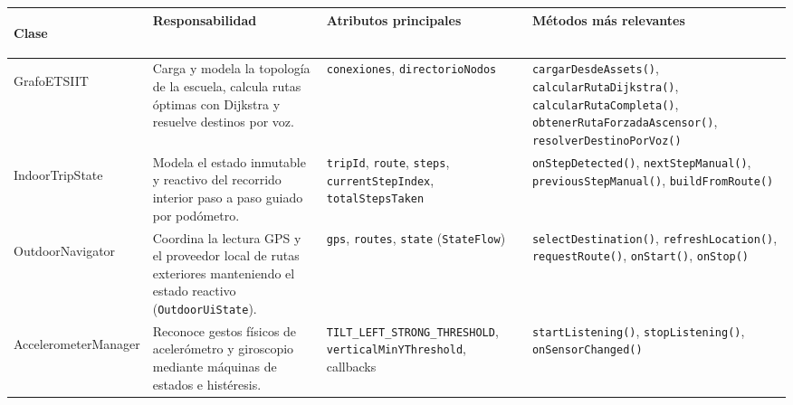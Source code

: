 \documentclass[11pt,a4paper]{article}
\begin{document}
\vspace{0.4cm}

\begin{table}[H]
\centering
\footnotesize
\setlength{\tabcolsep}{4.5pt}
\renewcommand{\arraystretch}{1.28}
\begin{tabularx}{\textwidth}{>{\bfseries\raggedright\arraybackslash}p{3.4cm} >{\raggedright\arraybackslash}p{4.1cm} >{\raggedright\arraybackslash}p{3.4cm} >{\raggedright\arraybackslash}X}
\toprule
\textbf{Clase} & \textbf{Responsabilidad} & \textbf{Atributos principales} & \textbf{Métodos más relevantes} \\
\midrule
GrafoETSIIT & Carga y modela la topología de la escuela, calcula rutas óptimas con Dijkstra y resuelve destinos por voz. & \texttt{conexiones}, \newline \texttt{directorioNodos} & \texttt{cargarDesdeAssets()}, \newline \texttt{calcularRuta\allowbreak Dijkstra()}, \newline \texttt{calcularRuta\allowbreak Completa()}, \newline \texttt{obtenerRutaForzada\allowbreak Ascensor()}, \newline \texttt{resolverDestino\allowbreak PorVoz()} \\
\midrule
IndoorTripState & Modela el estado inmutable y reactivo del recorrido interior paso a paso guiado por podómetro. & \texttt{tripId}, \texttt{route}, \texttt{steps}, \texttt{currentStepIndex}, \texttt{totalStepsTaken} & \texttt{onStepDetected()}, \newline \texttt{nextStepManual()}, \newline \texttt{previousStepManual()}, \newline \texttt{buildFromRoute()} \\
\midrule
OutdoorNavigator & Coordina la lectura GPS y el proveedor local de rutas exteriores manteniendo el estado reactivo (\texttt{OutdoorUiState}). & \texttt{gps}, \texttt{routes}, \newline \texttt{state} (\texttt{StateFlow}) & \texttt{selectDestination()}, \newline \texttt{refreshLocation()}, \newline \texttt{requestRoute()}, \newline \texttt{onStart()}, \texttt{onStop()} \\
\midrule
Accelerometer\allowbreak Manager & Reconoce gestos físicos de acelerómetro y giroscopio mediante máquinas de estados e histéresis. & \texttt{TILT\_LEFT\_STRONG\_\allowbreak THRESHOLD}, \newline \texttt{verticalMinY\allowbreak Threshold}, callbacks & \texttt{startListening()}, \newline \texttt{stopListening()}, \newline \texttt{onSensorChanged()} \\

\end{tabularx}
\end{table}
\end{document}
